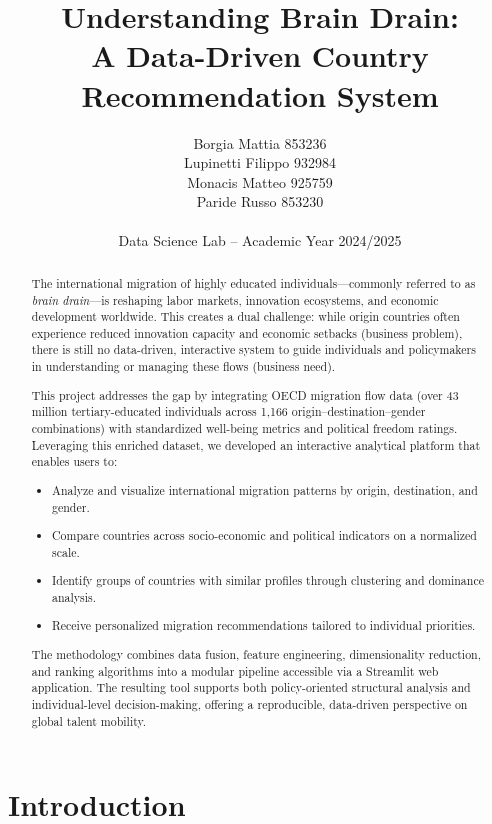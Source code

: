 \documentclass[11pt]{article}
\title{Understanding Brain Drain: \\
A Data-Driven Country Recommendation System}
\author{Borgia Mattia 853236 \\ Lupinetti Filippo 932984 \\ Monacis Matteo 925759 \\ Paride Russo 853230 \\ \\ Data Science Lab – Academic Year 2024/2025}
\date{}
\begin{document}
\maketitle

\begin{abstract}
\noindent
The international migration of highly educated individuals—commonly referred to as \textit{brain drain}—is reshaping labor markets, innovation ecosystems, and economic development worldwide. This creates a dual challenge: while origin countries often experience reduced innovation capacity and economic setbacks (business problem), there is still no data-driven, interactive system to guide individuals and policymakers in understanding or managing these flows (business need).  

\noindent
This project addresses the gap by integrating OECD migration flow data (over 43 million tertiary-educated individuals across 1{,}166 origin–destination–gender combinations) with standardized well-being metrics and political freedom ratings. Leveraging this enriched dataset, we developed an interactive analytical platform that enables users to:
\begin{itemize}
    \item Analyze and visualize international migration patterns by origin, destination, and gender.
    \item Compare countries across socio-economic and political indicators on a normalized scale.
    \item Identify groups of countries with similar profiles through clustering and dominance analysis.
    \item Receive personalized migration recommendations tailored to individual priorities.
\end{itemize}

\noindent
The methodology combines data fusion, feature engineering, dimensionality reduction, and ranking algorithms into a modular pipeline accessible via a Streamlit web application. The resulting tool supports both policy-oriented structural analysis and individual-level decision-making, offering a reproducible, data-driven perspective on global talent mobility.
\end{abstract}




\newpage

\tableofcontents
\newpage

\section{Introduction}
\end{document}
